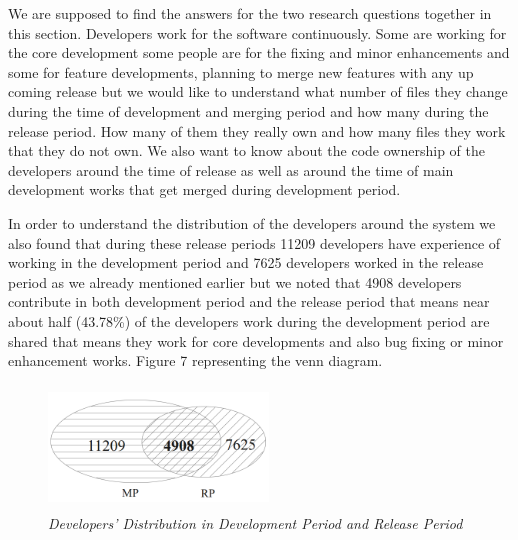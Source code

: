 \documentclass{acm_proc_article-sp}
\begin{document}
We are supposed to find the answers for the two research questions together in this section. Developers work for the software continuously. Some are working for the core development some people are for the fixing and minor enhancements and some for feature developments, planning to merge new features with any up coming release but we would like to understand what number of files they change during the time of development and merging period and how many during the release period. How many of them they really own and how many files they work that they do not own. We also want to know about the code ownership of the developers around the time of release as well as around the time of main development works that get merged during development period.

In order to understand the distribution of the developers around the system we also found that during these release periods 11209 developers have experience of working in the development period and 7625 developers worked in the release period as we already mentioned earlier but we noted that 4908 developers contribute in both development period and the release period that means near about half (43.78\%) of the developers work during the development period are shared that means they work for core developments and also bug fixing or minor enhancement works. Figure 7 representing the venn diagram.
\begin{figure}
\begin{center}
\includegraphics[height=1.3in,width=2.3in]{devDistMPRPvenn.png}
\caption{\small \sl Developers' Distribution in Development Period and Release Period}
\end{center}
\end{figure}
\end{document}
